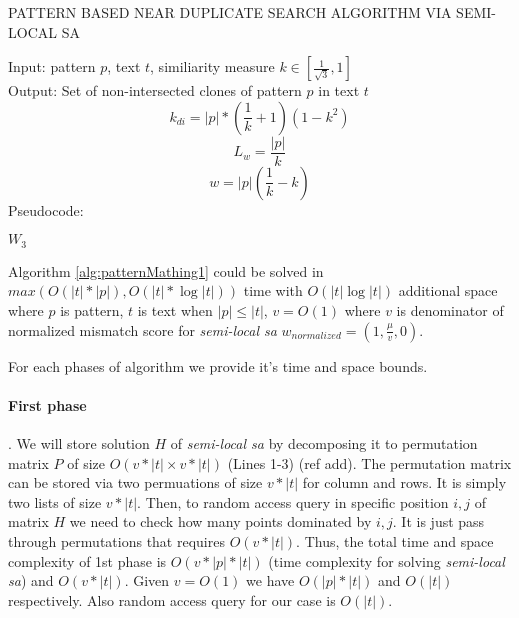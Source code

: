 \begin{algorithm}[H]
\caption{PATTERN BASED NEAR DUPLICATE
SEARCH ALGORITHM VIA SEMI-LOCAL SA}
\label{alg:patternMathing1}
Input: pattern $p$, text $t$, similiarity measure $k \in  [ \frac{1}{\sqrt{3}} ,1  ]$\\
Output: Set of non-intersected clones of pattern $p$ in text $t$
\begin{equation}
    k_{di}=|p|*(\frac{1}{k}+1)(1-k^2)
\end{equation}
\begin{equation}
 L_{w} = \frac{|p|} {k}
\end{equation}
\begin{equation}
  w = |p|(\frac{1}{k} - k)
\end{equation}
Pseudocode:
\begin{algorithmic}[1]
\ENDIF
\ENDFOR
\RETURN $W_3$

\end{algorithmic}
\end{algorithm}


\begin{theorem}
Algorithm \ref{alg:patternMathing1} could  be solved in
 $max(O(|t|*|p|),O(|t| * \log |t|))$  time with $O( |t| \log |t|)$ additional space where $p$ is pattern, $t$ is text when $|p| \leq |t|$, $v=O(1)$ where $v$ is denominator of normalized mismatch score for \emph{semi-local sa}
$w_{normalized} = (1,\frac{\mu}{v},0)$.
\end{theorem}

For each phases of algorithm we provide it's time and space bounds.

\paragraph{First phase}.
We will store solution $H$ of \emph{semi-local sa} by decomposing it to permutation matrix $P$ of size $O(v*|t|\times v*|t|)$ (Lines 1-3) (ref add).
The permutation matrix can be stored via two permuations of size $v*|t|$ for column and rows.
It is simply two lists of size $v*|t|$.
Then, to random access query in specific position $i,j$ of matrix $H$ we need to check how many points dominated by $i,j$.
It is just pass through permutations that requires $O(v*|t|)$.
Thus, the total time and space complexity of 1st phase is $O(v *|p| * |t|)$ (time complexity for solving \emph{semi-local sa}) and $O(v*|t|)$.
Given $v=O(1)$ we have $O(|p| * |t|)$ and $O(|t|)$ respectively.
Also random access query for our case is $O(|t|)$.

